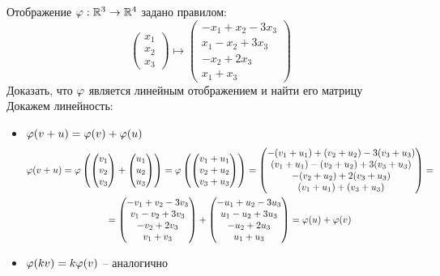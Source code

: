 Отображение $ \varphi : \mathbb{R}^3 \to \mathbb{R}^4 $ задано правилом:
$$
\begin{pmatrix}
	x_1 \\
    x_2 \\
    x_3
\end{pmatrix} \mapsto
\begin{pmatrix}
	-x_1 + x_2 - 3x_3 \\
    x_1 - x_2 + 3x_3 \\
    -x_2 + 2x_3 \\
    x_1 + x_3
\end{pmatrix} $$
Доказать, что $ \varphi $ является линейным отображением и найти его матрицу \\
Докажем линейность:
\begin{itemize}
	\item $ \varphi(v + u) = \varphi(v) + \varphi(u) $
    \begin{multline*}
        \varphi(v + u) = \varphi \left(
        \begin{pmatrix}
            v_1 \\
            v_2 \\
            v_3
        \end{pmatrix} +
        \begin{pmatrix}
            u_1 \\
            u_2 \\
            u_3
        \end{pmatrix} \right) = \varphi \left(
        \begin{pmatrix}
            v_1 + u_1 \\
            v_2 + u_2 \\
            v_3 + u_3
        \end{pmatrix} \right) =
        \begin{pmatrix}
            -(v_1 + u_1) + (v_2 + u_2) - 3(v_3 + u_3) \\
            (v_1 + u_1) - (v_2 + u_2) + 3(v_3 + u_3) \\
            -(v_2 + u_2) + 2(v_3 + u_3) \\
            (v_1 + u_1) + (v_3 + u_3)
        \end{pmatrix} = \\
        =
        \begin{pmatrix}
            -v_1 + v_2 - 3v_3 \\
            v_1 - v_2 + 3v_3 \\
            -v_2 + 2v_3 \\
            v_1 + v_3
        \end{pmatrix} +
        \begin{pmatrix}
            -u_1 + u_2 - 3u_3 \\
            u_1 - u_2 + 3u_3 \\
            -u_2 + 2u_3 \\
            u_1 + u_3
        \end{pmatrix} = \varphi(u) + \varphi(v)
    \end{multline*}
    \item $ \varphi(kv) = k\varphi(v) $ -- аналогично
\end{itemize}
